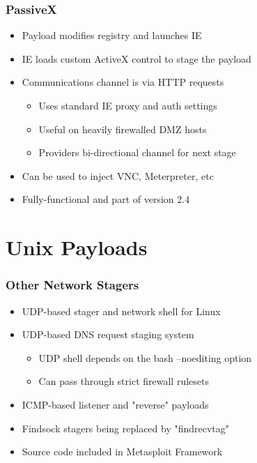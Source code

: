 \documentclass{beamer}
\newenvironment{sitemize}{\vspace{1mm}\begin{itemize}\itemsep 4pt\small}{\end{itemize}}
\begin{document}
\begin{frame}[t]
	\frametitle{PassiveX}
	\begin{sitemize}
		\item Payload modifies registry and launches IE
		\item IE loads custom ActiveX control to stage the payload
		\item Communications channel is via HTTP requests
		\begin{sitemize}
			\item Uses standard IE proxy and auth settings
			\item Useful on heavily firewalled DMZ hosts
			\item Providers bi-directional channel for next stage
		\end{sitemize}
	\end{sitemize}
	
	\begin{sitemize}
		\item Can be used to inject VNC, Meterpreter, etc
		\item Fully-functional and part of version 2.4
	\end{sitemize}	
\end{frame}


\section{Unix Payloads}

\begin{frame}[t]
	\frametitle{Other Network Stagers}
	\begin{sitemize}
		\item UDP-based stager and network shell for Linux
		\item UDP-based DNS request staging system
		\begin{sitemize}
			\item UDP shell depends on the bash --noediting option
			\item Can pass through strict firewall rulesets
		\end{sitemize}
	\end{sitemize}
	
	\begin{sitemize}	
		\item ICMP-based listener and "reverse" payloads
		\item Findsock stagers being replaced by "findrecvtag"
		\item Source code included in Metasploit Framework
	\end{sitemize}	
\end{frame}
\end{document}
